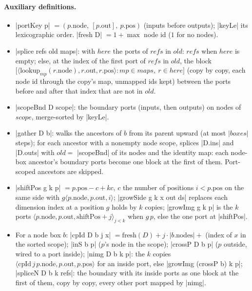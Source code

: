 \paragraph{Auxiliary definitions.}
\begin{itemize}
\item \lean|portKey p| $=(p.\mathrm{node},\ [p.\mathrm{out}],\ p.\mathrm{pos})$ (inputs before outputs);
  \lean|keyLe| its lexicographic order. \lean|fresh D| $=1+\max$ node id ($1$ for no nodes).
\item \lean|splice refs old maps|: with $here$ the ports of $refs$ in $old$: $refs$ when $here$ is
  empty; else, at the index of the first port of $refs$ in $old$, the block
  $\bigl[\langle\mathrm{lookup}_{mp}(r.\mathrm{node}),r.\mathrm{out},r.\mathrm{pos}\rangle: mp\in maps,\ r\in here\bigr]$
  (copy by copy, each node id through the copy's map, unmapped ids kept) between the ports before and
  after that index that are not in $old$.
\item \lean|scopeBnd D scope|: the boundary ports (inputs, then outputs) on nodes of $scope$,
  merge-sorted by \lean|keyLe|.
\item \lean|gather D b|: walks the ancestors of $b$ from its parent upward (at most $|boxes|$ steps);
  for each ancestor with a nonempty node scope, splices \lean|D.ins| and \lean|D.outs| with
  $old=$ \lean|scopeBnd| of its nodes and the identity map: each node-box ancestor's boundary ports
  become one block at the first of them. Port-scoped ancestors are skipped.
\item \lean|shiftPos g k p| $=p.\mathrm{pos}-c+kc$, $c$ the number of positions $i<p.\mathrm{pos}$ on the same
  side with $g\langle p.\mathrm{node},p.\mathrm{out},i\rangle$; \lean|growSide g k x out ds| replaces each
  dimension index at a position $g$ holds by $k$ copies; \lean|growImg g k p| is the $k$ ports
  $\langle p.\mathrm{node},p.\mathrm{out},\mathrm{shiftPos}+j\rangle_{j<k}$ when $g\,p$, else the one port at
  \lean|shiftPos|.
\item For a node box $b$: \lean|cpId D b j x| $=\mathrm{fresh}(D)+j\cdot|b.\mathrm{nodes}|+$ (index of $x$ in
  the sorted scope); \lean|inS b p| ($p$'s node in the scope); \lean|crossP D b p| ($p$ outside, wired
  to a port inside); \lean|nimg D b k p|: the $k$ copies $\langle\mathrm{cpId}\,j\,p.\mathrm{node},p.\mathrm{out},p.\mathrm{pos}\rangle$
  for an inside port, else \lean|growImg (crossP b) k p|; \lean|spliceN D b k refs|: the boundary with
  its inside ports as one block at the first of them, copy by copy, every other port mapped by
  \lean|nimg|.
\end{itemize}

